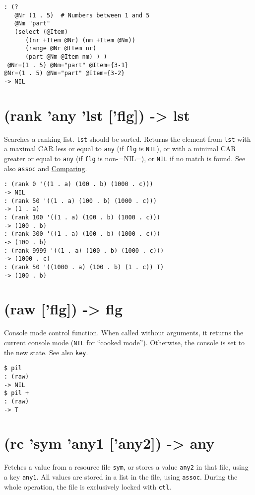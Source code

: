 {{{{{{{{\begin{verbatim}
: (?
   @Nr (1 . 5)  # Numbers between 1 and 5
   @Nm "part"
   (select (@Item)
      ((nr +Item @Nr) (nm +Item @Nm))
      (range @Nr @Item nr)
      (part @Nm @Item nm) ) )
 @Nr=(1 . 5) @Nm="part" @Item={3-1}                                              @Nr=(1 . 5) @Nm="part" @Item={3-2}
-> NIL
\end{verbatim}

 
\section{(rank 'any 'lst ['flg]) -> lst}
\label{sec-8-1-18-8}


Searches a ranking list. \texttt{lst} should be sorted. Returns the element
from \texttt{lst} with a maximal CAR less or equal to \texttt{any} (if \texttt{flg} is
\texttt{NIL}), or with a minimal CAR greater or equal to \texttt{any} (if \texttt{flg} is
non-=NIL=), or \texttt{NIL} if no match is found. See also \texttt{assoc} and
\hyperref[ref.html-cmp]{Comparing}.


\begin{verbatim}
: (rank 0 '((1 . a) (100 . b) (1000 . c)))
-> NIL
: (rank 50 '((1 . a) (100 . b) (1000 . c)))
-> (1 . a)
: (rank 100 '((1 . a) (100 . b) (1000 . c)))
-> (100 . b)
: (rank 300 '((1 . a) (100 . b) (1000 . c)))
-> (100 . b)
: (rank 9999 '((1 . a) (100 . b) (1000 . c)))
-> (1000 . c)
: (rank 50 '((1000 . a) (100 . b) (1 . c)) T)
-> (100 . b)
\end{verbatim}

 
\section{(raw ['flg]) -> flg}
\label{sec-8-1-18-9}


Console mode control function. When called without arguments, it returns
the current console mode (\texttt{NIL} for ``cooked mode''). Otherwise, the
console is set to the new state. See also \texttt{key}.


\begin{verbatim}
$ pil
: (raw)
-> NIL
$ pil +
: (raw)
-> T
\end{verbatim}

 
\section{(rc 'sym 'any1 ['any2]) -> any}
\label{sec-8-1-18-10}


Fetches a value from a resource file \texttt{sym}, or stores a value \texttt{any2} in
that file, using a key \texttt{any1}. All values are stored in a list in the
file, using \texttt{assoc}. During the whole operation, the file is exclusively
locked with \texttt{ctl}.


}}}}}}}}
